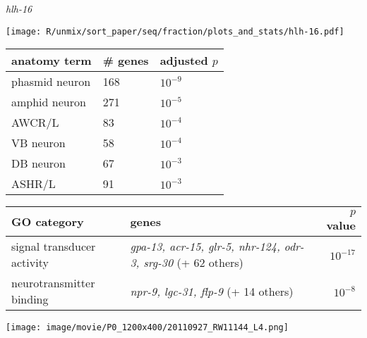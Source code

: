 \documentclass[serif,9pt]{beamer}
\begin{document}
\begin{frame}{{\em hlh-16}}

\begin{minipage}{0.4\textwidth}
\texttt{[image: R/unmix/sort\_paper/seq/fraction/plots\_and\_stats/hlh-16.pdf]}
\end{minipage}
\begin{minipage}{0.58\textwidth}
\begin{table}[!tbp]\scriptsize
\begin{tabular}{lll}
anatomy term & \# genes & adjusted $p$ \\
\hline
phasmid neuron & 168 & $10^{-9}$ \\
amphid neuron & 271 & $10^{-5}$ \\
AWCR/L & 83 & $10^{-4}$ \\
VB neuron & 58 & $10^{-4}$ \\
DB neuron & 67 & $10^{-3}$ \\
ASHR/L & 91 & $10^{-3}$ \\
\hline

\end{tabular}
\end{table}
\end{minipage}

\begin{table}\footnotesize
\begin{tabular}{llr}
GO category & genes & $p$ value \\
\hline
signal transducer activity & {\em gpa-13, acr-15, glr-5, nhr-124, odr-3, srg-30} (+ 62 others) & $10^{-17}$ \\
neurotransmitter binding & {\em npr-9, lgc-31, flp-9} (+ 14 others) & $10^{-8}$ \\
\end{tabular}
\end{table}

\texttt{[image: image/movie/P0\_1200x400/20110927\_RW11144\_L4.png]}

\end{frame}
\end{document}
